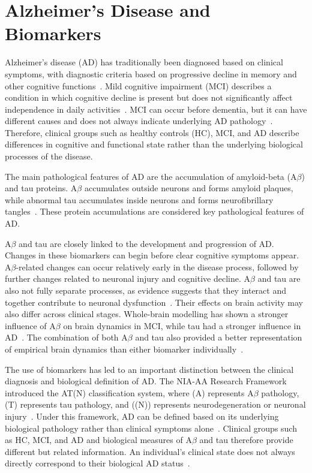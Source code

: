 \section{Alzheimer's Disease and Biomarkers}

Alzheimer’s disease (AD) has traditionally been diagnosed based on clinical symptoms, with diagnostic criteria based on progressive decline in memory and other cognitive functions~\cite{McKhann1984}. 
Mild cognitive impairment (MCI) describes a condition in which cognitive decline is present but does not significantly affect independence in daily activities~\cite{Albert2011MCI}. 
MCI can occur before dementia, but it can have different causes and does not always indicate underlying AD pathology~\cite{Albert2011MCI}. 
Therefore, clinical groups such as healthy controls (HC), MCI, and AD describe differences in cognitive and functional state rather than the underlying biological processes of the disease.

The main pathological features of AD are the accumulation of amyloid-beta (A$\beta$) and tau proteins.
A$\beta$ accumulates outside neurons and forms amyloid plaques, while abnormal tau accumulates inside neurons and forms neurofibrillary tangles~\cite{Busche2020Synergy}. 
These protein accumulations are considered key pathological features of AD\@.

A$\beta$ and tau are closely linked to the development and progression of AD\@.
Changes in these biomarkers can begin before clear cognitive symptoms appear.
A$\beta$-related changes can occur relatively early in the disease process, followed by further changes related to neuronal injury and cognitive decline.
A$\beta$ and tau are also not fully separate processes, as evidence suggests that they interact and together contribute to neuronal dysfunction~\cite{Busche2020Synergy}.
Their effects on brain activity may also differ across clinical stages.
Whole-brain modelling has shown a stronger influence of A$\beta$ on brain dynamics in MCI, while tau had a stronger influence in AD~\cite{Patow2023}.
The combination of both A$\beta$ and tau also provided a better representation of empirical brain dynamics than either biomarker individually~\cite{Patow2023}.

The use of biomarkers has led to an important distinction between the clinical diagnosis and biological definition of AD\@.
The NIA-AA Research Framework introduced the AT(N) classification system, where (A) represents A$\beta$ pathology, (T) represents tau pathology, and ((N)) represents neurodegeneration or neuronal injury~\cite{Jack2018}.
Under this framework, AD can be defined based on its underlying biological pathology rather than clinical symptoms alone~\cite{Jack2018}.
Clinical groups such as HC, MCI, and AD and biological measures of A$\beta$ and tau therefore provide different but related information.
An individual's clinical state does not always directly correspond to their biological AD status~\cite{Jack2018}.